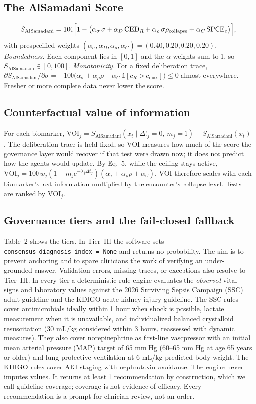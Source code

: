 \documentclass[11pt]{article}
\newcommand{\Sal}{S_{\mathrm{AlSamadani}}}
\begin{document}
\subsection{The AlSamadani Score}
\begin{equation}
\Sal=100\Bigl[1-\bigl(\alpha_\sigma\,\sigma+\alpha_D\,\mathrm{CED}_R+\alpha_\rho\,\sigma\rho_{\mathrm{collapse}}+\alpha_C\,\mathrm{SPCE}_e\bigr)\Bigr],
\end{equation}
with prespecified weights $(\alpha_\sigma,\alpha_D,\alpha_\rho,\alpha_C)=(0.40,0.20,0.20,0.20)$.
\textit{Boundedness.} Each component lies in $[0,1]$ and the $\alpha$ weights sum to 1, so $\Sal\in[0,100]$.
\textit{Monotonicity.} For a fixed deliberation trace,
$\partial\Sal/\partial\sigma=-100\bigl(\alpha_\sigma+\alpha_\rho\rho+\alpha_C\,\mathbb 1[c_R>c_{\max}]\bigr)\le0$
almost everywhere. Fresher or more complete data never lower the score.

\subsection{Counterfactual value of information}
For each biomarker, $\mathrm{VOI}_j=\Sal(x_t\mid \Delta t_j{=}0,\,m_j{=}1)-\Sal(x_t)$. The deliberation trace is held fixed,
so VOI measures how much of the score the governance layer would recover if that test were drawn now; it does not
predict how the agents would update. By Eq.~5, while the ceiling stays active,
$\mathrm{VOI}_j=100\,w_j(1-m_j e^{-\lambda_j\Delta t_j})(\alpha_\sigma+\alpha_\rho\rho+\alpha_C)$. VOI therefore scales with
each biomarker's lost information multiplied by the encounter's collapse level. Tests are ranked by $\mathrm{VOI}_j$.

\subsection{Governance tiers and the fail-closed fallback}
Table~2 shows the tiers. In Tier~III the software sets \texttt{consensus\_diagnosis\_index = None} and returns no
probability. The aim is to prevent anchoring and to spare clinicians the work of verifying an under-grounded answer.
Validation errors, missing traces, or exceptions also resolve to Tier~III. In every tier a deterministic rule engine
evaluates the \emph{observed} vital signs and laboratory values against the 2026 Surviving Sepsis Campaign (SSC) adult
guideline\cite{ssc2026} and the KDIGO acute kidney injury guideline.\cite{kdigo2012} The SSC rules cover antimicrobials
ideally within 1 hour when shock is possible, lactate measurement when it is unavailable, and individualized balanced
crystalloid resuscitation (30 mL/kg considered within 3 hours, reassessed with dynamic measures). They also cover
norepinephrine as first-line vasopressor with an initial mean arterial pressure (MAP) target of 65 mm Hg (60--65 mm Hg
at age 65 years or older) and lung-protective ventilation at 6 mL/kg predicted body weight. The KDIGO rules cover AKI
staging with nephrotoxin avoidance. The engine never imputes values. It returns at least 1 recommendation by construction,
which we call guideline coverage; coverage is not evidence of efficacy. Every recommendation is a prompt for clinician
review, not an order.
\end{document}
